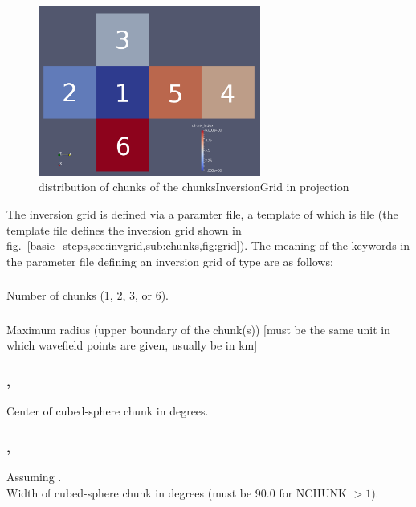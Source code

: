 \begin{figure}[ht]
  \centering
  \includegraphics[width=0.65\textwidth]{images/chunksInversionGrid_6-chunks_ichunk_LOCAL_FLAT_numbers.png}
  \caption{distribution of chunks of the chunksInversionGrid in  projection}
  \label{basic_steps,sec:invgrid,sub:chunks,fig:grid-ichunk}
\end{figure}

The inversion grid is defined via a paramter file, a template of which is file 
 (the template file defines the inversion grid
shown in fig.~\ref{basic_steps,sec:invgrid,sub:chunks,fig:grid}{}).
The meaning of the keywords in the parameter file defining an inversion grid of type 
are as follows:

\subsubsection{} %
Number of chunks (1, 2, 3, or 6).
\subsubsection{} 
Maximum radius (upper boundary of the chunk(s)) [must be the same unit in which wavefield points are given, usually be in km]
\subsubsection{, } 
Center of cubed-sphere chunk in degrees.
\subsubsection{, } 
Assuming .\\
Width of cubed-sphere chunk in degrees (must be 90.0 for NCHUNK $> 1$).
